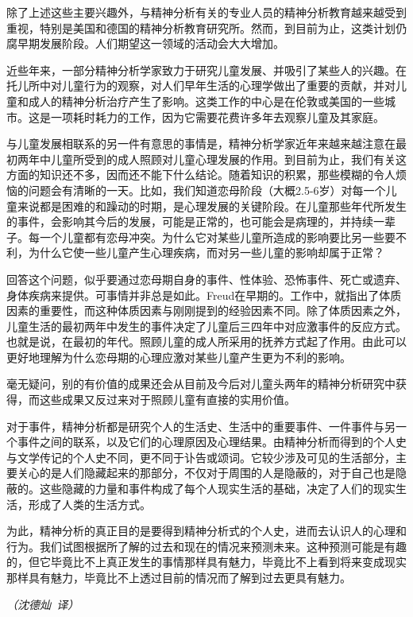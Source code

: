 \documentclass[UTF8,10pt,a4paper,openany]{book}
\newcommand{\signature}[1]{\begin{flushright}\slshape #1\end{flushright}}
\newcommand{\signatureB}{\signature{（沈德灿~译）}}
\begin{document}
除了上述这些主要兴趣外，与精神分析有关的专业人员的精神分析教育越来越受到重视，特别是美国和德国的精神分析教育研究所。然而，到目前为止，这类计划仍腐早期发展阶段。人们期望这一领域的活动会大大增加。

近些年来，一部分精神分析学家致力于研究儿童发展、并吸引了某些人的兴趣。在托儿所中对儿童行为的观察，对人们早年生活的心理学做出了重要的贡献，并对儿童和成人的精神分析治疗产生了影响。这类工作的中心是在伦敦或美国的一些城市。这是一项耗时耗力的工作，因为它需要花费许多年去观察儿童及其家庭。

与儿童发展相联系的另一件有意思的事情是，精神分析学家近年来越来越注意在最初两年中儿童所受到的成人照顾对儿童心理发展的作用。到目前为止，我们有关这方面的知识还不多，因而还不能下什么结论。随着知识的积累，那些模糊的令人烦恼的问题会有清晰的一天。比如，我们知道恋母阶段（大概2.5-6岁）对每一个儿童来说都是困难的和躁动的时期，是心理发展的关键阶段。在儿童那些年代所发生的事件，会影响其今后的发展，可能是正常的，也可能会是病理的，并持续一辈子。每一个儿童都有恋母冲突。为什么它对某些儿童所造成的影响要比另一些要不利，为什么它使一些儿童产生心理疾病，而对另一些儿童的影响却属于正常？

回答这个问题，似乎要通过恋母期自身的事件、性体验、恐怖事件、死亡或遗弃、身体疾病来提供。可事情并非总是如此。Freud在早期的。工作中，就指出了体质因素的重要性，而这种体质因素与刚刚提到的经验因素不同。除了体质因素之外，儿童生活的最初两年中发生的事件决定了儿童后三四年中对应激事件的反应方式。也就是说，在最初的年代。照顾儿童的成人所采用的抚养方式起了作用。由此可以更好地理解为什么恋母期的心理应激对某些儿童产生更为不利的影响。

毫无疑问，别的有价值的成果还会从目前及今后对儿童头两年的精神分析研究中获得，而这些成果又反过来对于照顾儿童有直接的实用价值。

对于事件，精神分析都是研究个人的生活史、生活中的重要事件、一件事件与另一个事件之间的联系，以及它们的心理原因及心理结果。由精神分析而得到的个人史与文学传记的个人史不同，更不同于讣告或颂词。它较少涉及可见的生活部分，主要关心的是人们隐藏起来的那部分，不仅对于周围的人是隐蔽的，对于自己也是隐蔽的。这些隐藏的力量和事件构成了每个人现实生活的基础，决定了人们的现实生活，形成了人类的生活方式。

为此，精神分析的真正目的是要得到精神分析式的个人史，进而去认识人的心理和行为。我们试图根据所了解的过去和现在的情况来预测未来。这种预测可能是有趣的，但它毕竟比不上真正发生的事情那样具有魅力，毕竟比不上看到将来变成现实那样具有魅力，毕竟比不上透过目前的情况而了解到过去更具有魅力。
\signatureB
\end{document}
